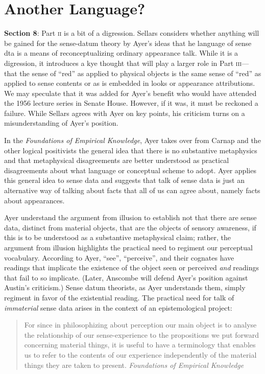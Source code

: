 \documentclass[11pt]{article}
\begin{document}

\section{Another Language?} %
\label{sec:another_language_}

\textbf{Section 8}: Part \textsc{ii} is a bit of a digression. Sellars considers whether anything will be gained for the sense-datum theory by Ayer's ideas that he language of sense dta is a means of reconceptualizing ordinary appearance talk. While it is a digression, it introduces a kye thought that will play a larger role in Part \textsc{iii}---that the sense of ``red'' as applied to physical objects is the same sense of ``red'' as applied to sense contents or as is embedded in looks or appearance attributions. We may speculate that it was added for Ayer's benefit who would have attended the 1956 lecture series in Senate House. However, if it was, it must be reckoned a failure. While Sellars agrees with Ayer on key points, his criticism turns on a misunderstanding of Ayer's position.

In the \emph{Foundations of Empirical Knowledge}, Ayer takes over from Carnap and the other logical positivists the general idea that there is no substantive metaphysics and that metaphysical disagreements are better understood as practical disagreements about what language or conceptual scheme to adopt. Ayer applies this general idea to sense data and suggests that talk of sense data is just an alternative way of talking about facts that all of us can agree about, namely facts about appearances.

Ayer understand the argument from illusion to establish not that there are sense data, distinct from material objects, that are the objects of sensory awareness, if this is to be understood as a substantive metaphysical claim; rather, the argument from illusion highlights the practical need to regiment our perceptual vocabulary. According to Ayer, ``see'', ``perceive'', and their cognates have readings that implicate the existence of the object seen or perceived \emph{and} readings that fail to so implicate. (Later, Anscombe will defend Ayer's position against Austin's criticism.) Sense datum theorists, as Ayer understands them, simply regiment in favor of the existential reading. The practical need for talk of \emph{immaterial} sense data arises in the context of an epistemological project:
\begin{quote}
	For since in philosophizing about perception our main object is to analyse the relationship of our sense-experience to the propositions we put forward concerning material things, it is useful to have a terminology that enables us to refer to the contents of our experience independently of the material things they are taken to present. \emph{Foundations of Empirical Knowledge}
\end{quote}
\end{document}
